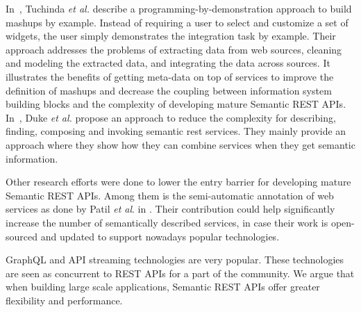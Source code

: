 In~\cite{Tuchinda:2011:BMD:1993053.1993058}, Tuchinda \textit{et al.} describe a programming-by-demonstration approach to build mashups by example. Instead of requiring a user to select and customize a set of widgets, the user simply demonstrates the integration task by example. Their approach addresses the problems of extracting data from web sources, cleaning and modeling the extracted data, and integrating the data across sources. It illustrates the benefits of getting meta-data on top of services to improve the definition of mashups and decrease the coupling between information system building blocks and the complexity of  developing mature Semantic REST APIs. In~\cite{10.1007/978-3-642-17694-4_11}, Duke \textit{et al.} propose an approach to reduce the complexity for describing, finding, composing and invoking semantic rest services. They mainly provide an approach where they show how they can combine services when they get semantic information. 

Other research efforts were done to lower the entry barrier for developing mature Semantic REST APIs. Among them is the semi-automatic annotation of web services as done by Patil \textit{et al}. in \cite{patil2004meteor}. Their contribution could help significantly increase the number of semantically described services, in case their work is open-sourced and updated to support nowadays popular technologies.

GraphQL and API streaming technologies are very popular. 
These technologies are seen as concurrent to REST APIs for a part of the community. 
We argue that when building large scale applications, Semantic REST APIs offer greater flexibility and performance.

